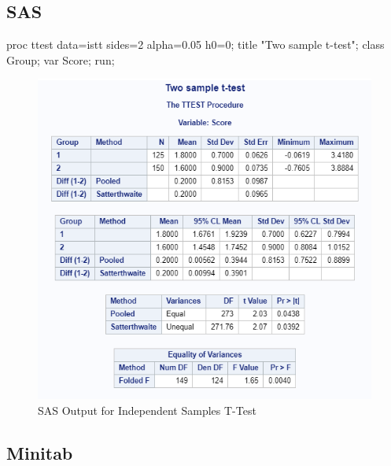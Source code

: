 \documentclass[
]{book}
\newenvironment{Shaded}{\begin{snugshade}}{\end{snugshade}}
\newcommand{\DecValTok}[1]{\textcolor[rgb]{0.00,0.00,0.81}{#1}}
\newcommand{\FloatTok}[1]{\textcolor[rgb]{0.00,0.00,0.81}{#1}}
\newcommand{\NormalTok}[1]{#1}
\newcommand{\StringTok}[1]{\textcolor[rgb]{0.31,0.60,0.02}{#1}}
\begin{document}
\hypertarget{sas}{%
\subsection{SAS}\label{sas}}

\begin{Shaded}
\begin{Highlighting}[]
\NormalTok{proc ttest data=istt sides=}\DecValTok{2}\NormalTok{ alpha=}\FloatTok{0.05}\NormalTok{ h0=}\DecValTok{0}\NormalTok{;}
\NormalTok{ 	title }\StringTok{"Two sample t-test"}\NormalTok{;}
\NormalTok{ 	class Group; }
\NormalTok{	var Score;}
\NormalTok{   run;}
\end{Highlighting}
\end{Shaded}

\begin{figure}[!h]
\includegraphics{Screenshots/Independent Samples T test/isttSAS} \caption{\label{fig:isttSAS}SAS Output for Independent Samples T-Test}\label{fig:isttSAS}
\end{figure}

\hypertarget{minitab}{%
\subsection{Minitab}\label{minitab}}
\end{document}
